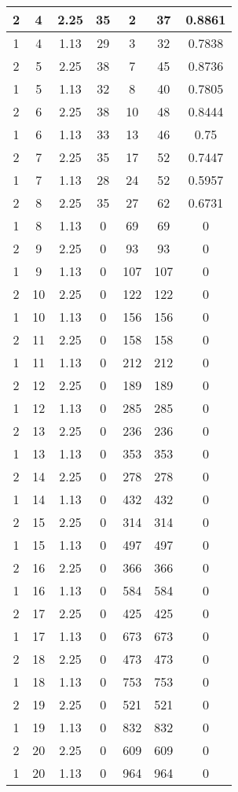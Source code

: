 \documentclass[letterpaper, 12pt]{article}
\begin{document}
\begin{longtable}{|c|c|c|c|c|c|c|}
\hline
2 & 4 & 2.25 & 35 & 2 & 37 & 0.8861 \\
\hline
1 & 4 & 1.13 & 29 & 3 & 32 & 0.7838 \\
\hline
2 & 5 & 2.25 & 38 & 7 & 45 & 0.8736 \\
\hline
1 & 5 & 1.13 & 32 & 8 & 40 & 0.7805 \\
\hline
2 & 6 & 2.25 & 38 & 10 & 48 & 0.8444 \\
\hline
1 & 6 & 1.13 & 33 & 13 & 46 & 0.75 \\
\hline
2 & 7 & 2.25 & 35 & 17 & 52 & 0.7447 \\
\hline
1 & 7 & 1.13 & 28 & 24 & 52 & 0.5957 \\
\hline
2 & 8 & 2.25 & 35 & 27 & 62 & 0.6731 \\
\hline
1 & 8 & 1.13 & 0 & 69 & 69 & 0 \\
\hline
2 & 9 & 2.25 & 0 & 93 & 93 & 0 \\
\hline
1 & 9 & 1.13 & 0 & 107 & 107 & 0 \\
\hline
2 & 10 & 2.25 & 0 & 122 & 122 & 0 \\
\hline
1 & 10 & 1.13 & 0 & 156 & 156 & 0 \\
\hline
2 & 11 & 2.25 & 0 & 158 & 158 & 0 \\
\hline
1 & 11 & 1.13 & 0 & 212 & 212 & 0 \\
\hline
2 & 12 & 2.25 & 0 & 189 & 189 & 0 \\
\hline
1 & 12 & 1.13 & 0 & 285 & 285 & 0 \\
\hline
2 & 13 & 2.25 & 0 & 236 & 236 & 0 \\
\hline
1 & 13 & 1.13 & 0 & 353 & 353 & 0 \\
\hline
2 & 14 & 2.25 & 0 & 278 & 278 & 0 \\
\hline
1 & 14 & 1.13 & 0 & 432 & 432 & 0 \\
\hline
2 & 15 & 2.25 & 0 & 314 & 314 & 0 \\
\hline
1 & 15 & 1.13 & 0 & 497 & 497 & 0 \\
\hline
2 & 16 & 2.25 & 0 & 366 & 366 & 0 \\
\hline
1 & 16 & 1.13 & 0 & 584 & 584 & 0 \\
\hline
2 & 17 & 2.25 & 0 & 425 & 425 & 0 \\
\hline
1 & 17 & 1.13 & 0 & 673 & 673 & 0 \\
\hline
2 & 18 & 2.25 & 0 & 473 & 473 & 0 \\
\hline
1 & 18 & 1.13 & 0 & 753 & 753 & 0 \\
\hline
2 & 19 & 2.25 & 0 & 521 & 521 & 0 \\
\hline
1 & 19 & 1.13 & 0 & 832 & 832 & 0 \\
\hline
2 & 20 & 2.25 & 0 & 609 & 609 & 0 \\
\hline
1 & 20 & 1.13 & 0 & 964 & 964 & 0 \\
\hline
\end{longtable}
\end{document}
